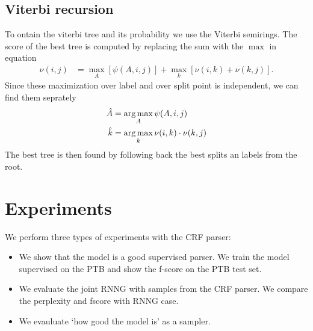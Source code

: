 \subsection{Viterbi recursion}
  To ontain the viterbi tree and its probability we use the Viterbi semirings. The score of the best tree is computed by replacing the sum with the $\max$ in equation
  \begin{align}
  \label{eq:viterbi-score}
    \nu(i,j)
      &= \max_{A} [ \psi(A, i, j) ] + \max_{k} [\nu(i,k) + \nu(k,j)].
  \end{align}
  Since these maximization over label and over split point is independent, we can find them seprately
  \begin{align}
  \label{eq:viterbi-tree}
    \hat{A} &= \operatorname*{arg\,max}_{ A  } \psi(A, i, j)  \\
    \hat{k} &= \operatorname*{arg\,max}_{ k } \nu(i, k) \cdot \nu(k, j)
  \end{align}
  The best tree is then found by following back the best splits an labels from the root.


\section{Experiments}
  We perform three types of experiments with the CRF parser:
  \begin{itemize}
    \item We show that the model is a good supervised parser. We train the model supervised on the PTB and show the f-score on the PTB test set.
    \item We evaluate the joint RNNG with samples from the CRF parser. We compare the perplexity and fscore with RNNG case.
    \item We evauluate `how good the model is' as a sampler.
  \end{itemize}


